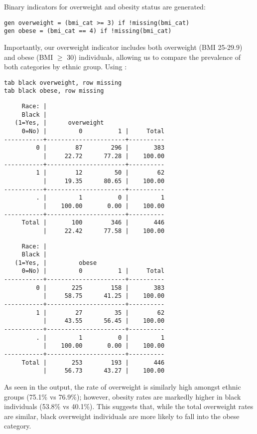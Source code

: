 Binary indicators for overweight and obesity status are generated:

\begin{verbatim}
gen overweight = (bmi_cat >= 3) if !missing(bmi_cat)
gen obese = (bmi_cat == 4) if !missing(bmi_cat)
\end{verbatim}

Importantly, our overweight indicator includes both overweight (BMI 25-29.9) and obese (BMI $\geq$ 30) individuals, allowing us to compare the prevalence of both categories by ethnic group. Using :

\begin{verbatim}
tab black overweight, row missing
tab black obese, row missing
\end{verbatim}

\newpage

\begin{verbatim}
     Race: |
     Black |
   (1=Yes, |      overweight
     0=No) |         0          1 |     Total
-----------+----------------------+----------
         0 |        87        296 |       383 
           |     22.72      77.28 |    100.00 
-----------+----------------------+----------
         1 |        12         50 |        62 
           |     19.35      80.65 |    100.00 
-----------+----------------------+----------
         . |         1          0 |         1 
           |    100.00       0.00 |    100.00 
-----------+----------------------+----------
     Total |       100        346 |       446 
           |     22.42      77.58 |    100.00 
\end{verbatim}

\begin{verbatim}
     Race: |
     Black |
   (1=Yes, |         obese
     0=No) |         0          1 |     Total
-----------+----------------------+----------
         0 |       225        158 |       383 
           |     58.75      41.25 |    100.00 
-----------+----------------------+----------
         1 |        27         35 |        62 
           |     43.55      56.45 |    100.00 
-----------+----------------------+----------
         . |         1          0 |         1 
           |    100.00       0.00 |    100.00 
-----------+----------------------+----------
     Total |       253        193 |       446 
           |     56.73      43.27 |    100.00 

\end{verbatim}

As seen in the output, the rate of overweight is similarly high amongst ethnic groups (75.1\% vs 76.9\%); however, obesity rates are markedly higher in black individuals (53.8\% vs 40.1\%). This suggests that, while the total overweight rates are similar, black overweight individuals are more likely to fall into the obese category.

